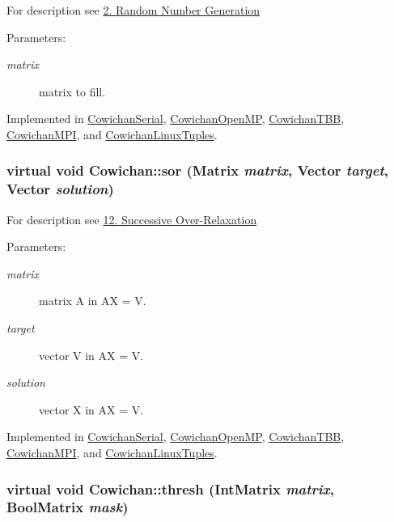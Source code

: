 For description see \hyperlink{index_randmat_sec}{2. Random Number Generation} \begin{Desc}
\item[Parameters:]
\begin{description}
\item[{\em matrix}]matrix to fill. \end{description}
\end{Desc}


Implemented in \hyperlink{class_cowichan_serial_2d24c0e562f7b109ec2ed916f38e5911}{CowichanSerial}, \hyperlink{class_cowichan_open_m_p_2c7c4e4dd96f82b7280a412c1fceed2c}{CowichanOpenMP}, \hyperlink{class_cowichan_t_b_b_b9b5cb4b4b5dc8907b2a01825cd4aaff}{CowichanTBB}, \hyperlink{class_cowichan_m_p_i_6805f21144aeaeddc4549e1b2b42bca8}{CowichanMPI}, and \hyperlink{class_cowichan_linux_tuples_ff90c6a27db51366570b70d352de7fab}{CowichanLinuxTuples}.\hypertarget{class_cowichan_92d8d9ae77208115fdfe69e1174f601c}{
\subsubsection[{sor}]{\setlength{\rightskip}{0pt plus 5cm}virtual void Cowichan::sor ({\bf Matrix} {\em matrix}, \/  {\bf Vector} {\em target}, \/  {\bf Vector} {\em solution})}}
\label{class_cowichan_92d8d9ae77208115fdfe69e1174f601c}


For description see \hyperlink{index_sor_sec}{12. Successive Over-Relaxation} \begin{Desc}
\item[Parameters:]
\begin{description}
\item[{\em matrix}]matrix A in AX = V. \item[{\em target}]vector V in AX = V. \item[{\em solution}]vector X in AX = V. \end{description}
\end{Desc}


Implemented in \hyperlink{class_cowichan_serial_6e8b06711d976de1adc1e4dc81e560e5}{CowichanSerial}, \hyperlink{class_cowichan_open_m_p_d6482d0369a26a51ef0e37ab238fc664}{CowichanOpenMP}, \hyperlink{class_cowichan_t_b_b_dbb32ce457d0edca6815ab1cb2459276}{CowichanTBB}, \hyperlink{class_cowichan_m_p_i_7388c844e8aa73ab0923443a3a7ef069}{CowichanMPI}, and \hyperlink{class_cowichan_linux_tuples_aa2c469c3f520a5a56c5ec1ac9a5a6c6}{CowichanLinuxTuples}.\hypertarget{class_cowichan_a0b633b8c1f21884e0998a9c7020c08c}{
\subsubsection[{thresh}]{\setlength{\rightskip}{0pt plus 5cm}virtual void Cowichan::thresh ({\bf IntMatrix} {\em matrix}, \/  {\bf BoolMatrix} {\em mask})}}
\label{class_cowichan_a0b633b8c1f21884e0998a9c7020c08c}


